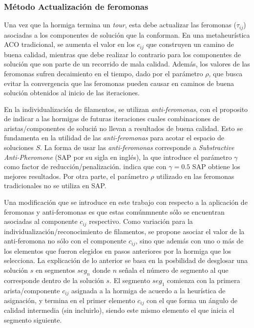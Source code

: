 \subsubsection{M\'etodo Actualizaci\'on de feromonas}
\label{subsec:pheroUpdate}
Una vez que la hormiga termina un {\it tour}, esta debe actualizar las feromonas ($\tau_{ij}$) asociadas a los componentes de soluci\'on que la conforman. En una metaheur\'istica ACO tradicional, se aumenta el valor en los $c_{ij}$ que construyen un camino de buena calidad, mientras que debe realizar lo contrario para los componentes de soluci\'on que son parte de un recorrido de mala calidad. Adem\'as, los valores de las feromonas sufren decaimiento en el tiempo, dado por el par\'ametro $\rho$, que busca evitar la convergencia que las feromonas pueden causar en caminos de buena soluci\'on obtenidos al inicio de las iteraciones.


En la individualizaci\'on de filamentos, se utilizan {\it anti-feromonas}, con el proposito de indicar a las hormigas de futuras iteraciones cuales combinaciones de aristas/componentes de soluci\'n no llevan a resultados de buena calidad. Esto se fundamenta en la utilidad de las {\it anti-feromonas} para acotar el espacio de soluciones $S$. La forma de usar las {\it anti-feromonas} corresponde a {\it Substractive Anti-Pheromone} (SAP por su sigla en ingl\'es), la que introduce el par\'ametro $\gamma$ como factor de reducci\'on/penalizaci\'on. \cite{montgomery2002anti} indica que con $\gamma = 0.5$ SAP obtiene los mejores resultados. Por otra parte, el par\'ametro $\rho$ utilizado en las feromonas tradicionales no se utiliza en SAP.


Una modificaci\'on que se introduce en este trabajo con respecto a la aplicaci\'on de  feromonas y anti-feromonas es que estas com\'unmnente s\'olo se encuentran asociadas al componente $c_{ij}$ respectivo. Como variaci\'on para la individualizaci\'on/reconocimiento de filamentos, se propone asociar el valor de la anti-feromona no s\'olo con el componente $c_{ij}$, sino que adem\'as con uno o m\'as de los elementos que fueron elegidos en pasos anteriores por la hormiga que los selecciona. La explicaci\'on de lo anterior se basa en la posbilidad de desglosar una soluci\'on $s$ en segmentos $seg_{n}$ donde $n$ se\~nala el n\'umero de segmento al que corresponde dentro de la soluci\'on $s$. El segmento $seg_1$ comienza con la primera arista/componente $c_{ij}$ asignada a la hormiga de acuerdo a la heur\'istica de asignaci\'on, y termina en el primer elemento $c_{ij}$ con el que forma un \'angulo de calidad intermedia (sin incluirlo), siendo este mismo elemento el que inicia el segmento siguiente.



